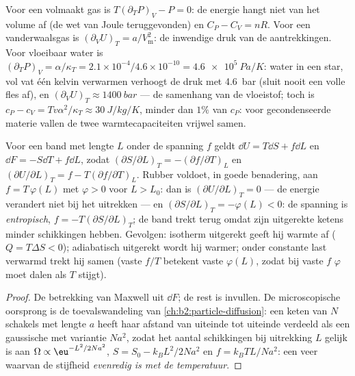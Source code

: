 \begin{example}\label{ex:b2:thermodynamic-potentials:reveal}
Voor een volmaakt gas is $T(\partial_TP)_V - P = 0$: de energie hangt niet
van het volume af (de wet van Joule teruggevonden) en $C_P - C_V = nR$. Voor een
vanderwaalsgas is $(\partial_VU)_T = a/V_{\text{m}}^2$: de inwendige druk van
de aantrekkingen. Voor vloeibaar water is
$(\partial_TP)_V = \alpha/\kappa_T = 2.1
\times 10^{-4}/4.6 \times 10^{-10} = \qty{4.6e5}{Pa/K}$:
water in een
star, vol vat één kelvin verwarmen verhoogt de druk met \qty{4.6}{bar}
(sluit nooit een volle fles af), en $(\partial_VU)_T \approx \qty{1400}{bar}$ ---
de samenhang van de vloeistof; toch is
$c_P - c_V = Tv\alpha^2/\kappa_T \approx
\qty{30}{J/kg/K}$, minder dan $1\%$
van $c_P$: voor gecondenseerde materie vallen de twee
warmtecapaciteiten vrijwel samen.
\end{example}

\begin{proposition}\label{prop:b2:thermodynamic-potentials:rubber}
Voor een band met lengte $L$ onder de spanning $f$ geldt $\dd U = T\dd S + f\dd L$
en $\dd F = -S\dd T + f\dd L$, zodat
$(\partial S/\partial L)_T =
-(\partial f/\partial T)_L$ en
$(\partial U/\partial L)_T = f - T(\partial f/
\partial T)_L$. Rubber
voldoet, in goede benadering, aan $f = T\,\varphi(L)$
met $\varphi > 0$ voor $L > L_0$: dan is $(\partial U/\partial L)_T = 0$ --- de
energie verandert niet bij het uitrekken --- en
$(\partial S/\partial L)_T =
-\varphi(L) < 0$: de spanning is
\emph{entropisch}, $f = -T(\partial S/\partial
L)_T$; de band trekt terug
omdat zijn uitgerekte ketens minder
schikkingen hebben. Gevolgen: isotherm uitgerekt geeft hij warmte af
($Q = T\Delta S < 0$); adiabatisch uitgerekt wordt hij warmer; onder
constante last verwarmd trekt hij samen (vaste $f/T$ betekent vaste
$\varphi(L)$, zodat bij
vaste $f$ $\varphi$ moet dalen als $T$ stijgt).
\end{proposition}

\begin{proof}
De betrekking van Maxwell uit $\dd F$; de rest is invullen. De
microscopische oorsprong is de toevalswandeling van \cref{ch:b2:particle-diffusion}:
een keten van $N$ schakels met lengte $a$ heeft haar afstand van uiteinde
tot uiteinde
verdeeld als een gaussische met variantie $Na^2$, zodat het aantal
schikkingen bij uitrekking $L$ gelijk is aan
$\Omega \propto \eu^{-L^2/2Na^2}$, $S = S_0 -
k_BL^2/2Na^2$ en
$f = k_BTL/Na^2$: een veer waarvan de stijfheid
\emph{evenredig is met de temperatuur}.
\end{proof}

